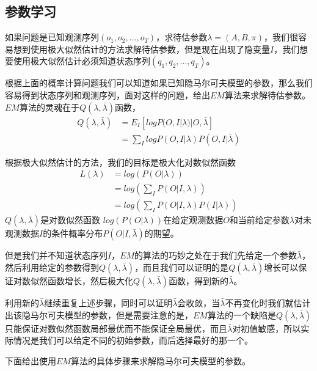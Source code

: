 \documentclass[a4paper,12pt]{ctexart}     %
\begin{document}
		\subsection{参数学习}
		如果问题是已知观测序列$ (o_1,o_2,\dots,o_T) $，求待估参数$ \lambda = (A,B,\pi) $，我们很容易想到使用极大似然估计的方法求解待估参数，但是现在出现了隐变量$ I $，我们想要使用极大似然估计必须知道状态序列$ (q_1,q_2,\dots,q_T) $。
		
		根据上面的概率计算问题我们可以知道如果已知隐马尔可夫模型的参数，那么我们容易得到状态序列和观测序列，面对这样的问题，给出$ EM $算法来求解待估参数。
		$ EM $算法的灵魂在于$ Q(\lambda,\bar{\lambda}) $函数，
		\begin{equation}
			\begin{split}
				Q(\lambda,\bar{\lambda}) &= E_I[logP(O,I|\lambda)|O,\bar{\lambda}] \\
				&= \sum_{I}logP(O,I|\lambda)P(O,I|\bar{\lambda})
			\end{split}
		\end{equation}
	
		根据极大似然估计的方法，我们的目标是极大化对数似然函数
		\begin{equation}
			\begin{split}
				L(\lambda) &= log(P(O|\lambda)) \\
				&= log(\sum_{I}P(O|I,\lambda)) \\
				&= log(\sum_{I}P(O|I,\lambda)P(I|\lambda))
			\end{split}
		\end{equation}
	$ Q(\lambda,\bar{\lambda}) $是对数似然函数 $ log(P(O|\lambda)) $在给定观测数据$ O $和当前给定参数$ \bar{\lambda} $对未观测数据$ I $的条件概率分布$ P(O|I,\bar{\lambda}) $的期望。
	
		但是我们并不知道状态序列$ I $，$ EM $的算法的巧妙之处在于我们先给定一个参数$ \bar{\lambda} $，然后利用给定的参数得到$ Q(\lambda,\bar{\lambda}) $，而且我们可以证明的是$ Q(\lambda,\bar{\lambda}) $增长可以保证对数似然函数增长，然后极大化$ Q(\lambda,\bar{\lambda}) $函数，得到新的$ \bar{\lambda} $。
		
		利用新的$ \bar{\lambda} $继续重复上述步骤，同时可以证明$ \bar{\lambda} $会收敛，当$ \bar{\lambda} $不再变化时我们就估计出该隐马尔可夫模型的参数，但是需要注意的是，$ EM $算法的一个缺陷是$ Q(\lambda,\bar{\lambda}) $只能保证对数似然函数局部最优而不能保证全局最优，而且$ \bar{\lambda} $对初值敏感，所以实际情况是我们可以给定不同的初始参数，而后选择最好的那一个。
		
		下面给出使用$ EM $算法的具体步骤来求解隐马尔可夫模型的参数。
		
\end{document}
